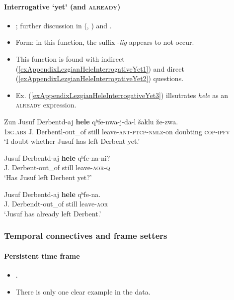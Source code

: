 \paragraph{Interrogative \lq yet\rq{ }(and \textsc{already})}
\label{appendixLezgianHeleInterrogativeYet}
\begin{itemize}
	\item \textcite{Haspelmath1991}; further discussion in \citeauthor{vanderAuwera1993} (\citeyear{vanderAuwera1993},  \citeyear{vanderAuwera1998})  and \textcite[195–197]{vanBaar1997}.
	\item Form: in this function, the suffix \mbox{-\textit{lig}} appears to not occur.
	\item This function is found with indirect (\ref{exAppendixLezgianHeleInterrogativeYet1}) and direct (\ref{exAppendixLezgianHeleInterrogativeYet2}) questions.
	\item Ex. (\ref{exAppendixLezgianHeleInterrogativeYet3}) illsutrates \textit{hele} as an \textsc{already} expression.
\end{itemize}
\begin{exe}
	\ex\label{exAppendixLezgianHeleInterrogativeYet1}
	\gll Zun Jusuf Derbentd-aj \textbf{hele} qʰfe-nwa-j-da-l šaklu že-zwa.\\
	1\textsc{sg}.\textsc{abs} J. Derbentl-out\_of still leave-\textsc{ant}-\textsc{ptcp}-\textsc{nmlz}-on doubting \textsc{cop}-\textsc{ipfv}\\
	\glt \lq I doubt whether Jusuf has left Derbent yet.' \parencite[84]{Haspelmath1991}

	\ex\label{exAppendixLezgianHeleInterrogativeYet2}
	\gll Jusuf Derbentd-aj \textbf{hele} qʰfe-na-ni?\\
	J. Derbent-out\_of still leave-\textsc{aor}-\textsc{q}\\
	\glt \lq Has Jusuf left Derbent yet?' \parencite[84]{Haspelmath1991}
	
	\ex\label{exAppendixLezgianHeleInterrogativeYet3}
	\gll Jusuf Derbentd-aj \textbf{hele} qʰfe-na.\\
	J. Derbendt-out\_of still leave-\textsc{aor}\\
	\glt \lq Jusuf has already left Derbent.\rq{ }\parencite[210]{Haspelmath1993}
\end{exe}

\subsubsection{Temporal connectives and frame setters}
\paragraph{Persistent time frame}
\label{appendixLezgianContinuative}
\begin{itemize}
	\item \textcite{Haspelmath1991}.
	\item There is only one clear example in the data.
\end{itemize}

